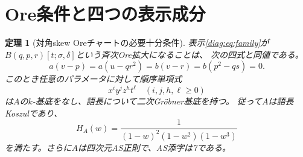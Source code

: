 \documentclass[11pt,a4paper]{ltjsarticle}
\newtheorem{theorem}{定理}[section]
\theoremstyle{definition}
\begin{document}
\section{Ore条件と四つの表示成分}
\begin{theorem}[対角skew Oreチャートの必要十分条件]\label{diag:thm:ore-condition}
表示\eqref{diag:eq:family}が
$B(q,p,r)[t;\sigma,\delta]$という斉次Ore拡大になることは、
次の四式と同値である。
\begin{equation}\label{diag:eq:conditions}
\boxed{
 a(v-p)=a(u-qr^2)=b(v-r)=b(p^2-qs)=0.
}
\end{equation}
このとき任意のパラメータに対して順序単項式
\[
 x^iy^jz^ht^\ell\quad(i,j,h,\ell\geq0)
\]
は$A$の$k$-基底をなし、語長について二次Gr\"obner基底を持つ。
従って$A$は語長Koszulであり、
\begin{equation}\label{diag:eq:hilbert}
H_A(w)=\frac1{(1-w)^2(1-w^2)(1-w^3)}
\end{equation}
を満たす。さらに$A$は四次元AS正則で、AS添字は7である。
\end{theorem}
\end{document}
